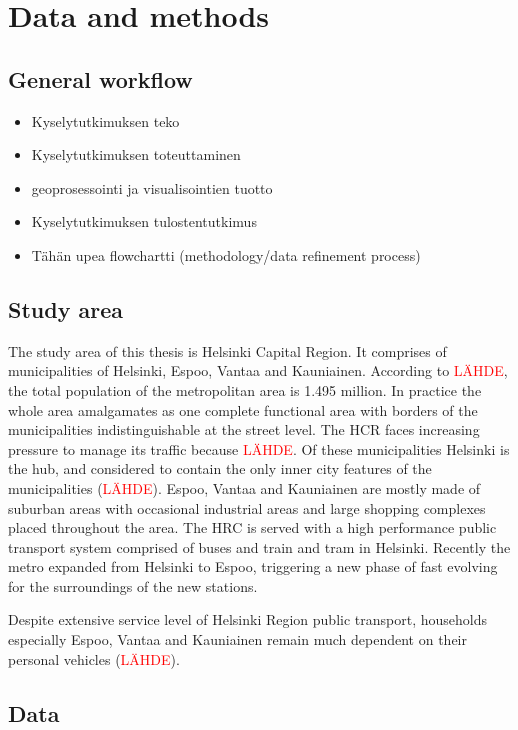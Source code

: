 \section{Data and methods}
\subsection{General workflow}
\justify
\begin{itemize}
    \item Kyselytutkimuksen teko
    \item Kyselytutkimuksen toteuttaminen
    \item geoprosessointi ja visualisointien tuotto
    \item Kyselytutkimuksen tulostentutkimus
    \item Tähän upea flowchartti (methodology/data refinement process)
\end{itemize}

\subsection{Study area}
\justify
The study area of this thesis is Helsinki Capital Region. It comprises of municipalities of Helsinki, Espoo, Vantaa and Kauniainen. According to \textcolor{red}{LÄHDE}, the total population of the metropolitan area is 1.495 million. In practice the whole area amalgamates as one complete functional area with borders of the municipalities indistinguishable at the street level. The HCR faces increasing pressure to manage its traffic because \textcolor{red}{LÄHDE}. Of these municipalities Helsinki is the hub, and considered to contain the only inner city features of the municipalities (\textcolor{red}{LÄHDE}). Espoo, Vantaa and Kauniainen are mostly made of suburban areas with occasional industrial areas and large shopping complexes placed throughout the area. The HRC is served with a high performance public transport system comprised of buses and train and tram in Helsinki. Recently the metro expanded from Helsinki to Espoo, triggering a new phase of fast evolving for the surroundings of the new stations.

Despite extensive service level of Helsinki Region public transport, households especially Espoo, Vantaa and Kauniainen remain much dependent on their personal vehicles (\textcolor{red}{LÄHDE}). 

\subsection{Data}
\justify

